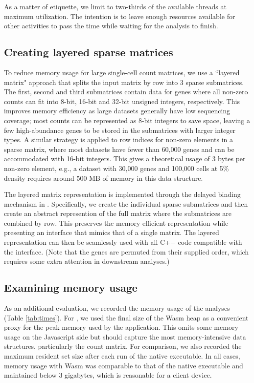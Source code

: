 \documentclass{article}
\begin{document}
As a matter of etiquette, we limit  to two-thirds of the available threads at maximum utilization.
The intention is to leave enough resources available for other activities to pass the time while waiting for the analysis to finish.

\subsection{Creating layered sparse matrices}

To reduce memory usage for large single-cell count matrices, we use a ``layered matrix" approach that splits the input matrix by row into 3 sparse submatrices.
The first, second and third submatrices contain data for genes where all non-zero counts can fit into 8-bit, 16-bit and 32-bit unsigned integers, respectively.
This improves memory efficiency as large datasets generally have low sequencing coverage;
most counts can be represented as 8-bit integers to save space, leaving a few high-abundance genes to be stored in the submatrices with larger integer types.
A similar strategy is applied to row indices for non-zero elements in a sparse matrix, where most datasets have fewer than 60,000 genes and can be accommodated with 16-bit integers.
This gives a theoretical usage of 3 bytes per non-zero element, e.g., a dataset with 30,000 genes and 100,000 cells at 5\% density requires around 500 MB of memory in this data structure.

The layered matrix representation is implemented through the delayed binding mechanism in .
Specifically, we create the individual sparse submatrices and then create an abstract represention of the full matrix where the submatrices are combined by row.
This preserves the memory-efficient representation while presenting an interface that mimics that of a single matrix.
The layered representation can then be seamlessly used with all C++ code compatible with the  interface.
(Note that the genes are permuted from their supplied order, which requires some extra attention in downstream analyses.)

\subsection{Examining memory usage}

As an additional evaluation, we recorded the memory usage of the  analyses (Table \ref{tab:times}).
For , we used the final size of the Wasm heap as a convenient proxy for the peak memory used by the application.
This omits some memory usage on the Javascript side but should capture the most memory-intensive data structures, particularly the count matrix.
For comparison, we also recorded the maximum resident set size after each run of the native executable.
In all cases, memory usage with Wasm was comparable to that of the native executable and maintained below 3 gigabytes,
which is reasonable for a client device.
\end{document}
